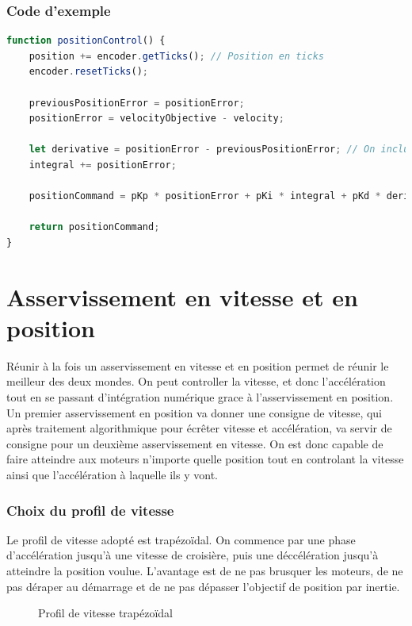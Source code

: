     \subsubsection{Code d'exemple}
            \begin{lstlisting}[language=JavaScript]
function positionControl() {
    position += encoder.getTicks(); // Position en ticks
    encoder.resetTicks();

    previousPositionError = positionError;
    positionError = velocityObjective - velocity;

    let derivative = positionError - previousPositionError; // On inclut le 1/DeltaT dans pKd
    integral += positionError;

    positionCommand = pKp * positionError + pKi * integral + pKd * derivative;

    return positionCommand;
}
            \end{lstlisting}

    \section{Asservissement en vitesse et en position}
        Réunir à la fois un asservissement en vitesse et en position permet de réunir le meilleur des deux mondes. On peut controller la vitesse, et donc l'accélération tout en se passant d'intégration numérique grace à l'asservissement en position.\\
        Un premier asservissement en position va donner une consigne de vitesse, qui après traitement algorithmique pour écrêter vitesse et accélération, va servir de consigne pour un deuxième asservissement en vitesse. On est donc capable de faire atteindre aux moteurs n'importe quelle position tout en controlant la vitesse ainsi que l'accélération à laquelle ils y vont.

        \subsubsection{Choix du profil de vitesse}
        Le profil de vitesse adopté est trapézoïdal. On commence par une phase d'accélération jusqu'à une vitesse de croisière, puis une déccélération jusqu'à atteindre la position voulue. L'avantage est de ne pas brusquer les moteurs, de ne pas déraper au démarrage et de ne pas dépasser l'objectif de position par inertie.

        \begin{figure}[h]
            \centering
            
            \caption{Profil de vitesse trapézoïdal}
        \end{figure}

